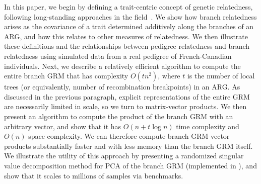 In this paper, we begin by defining a trait-centric concept of genetic relatedness, following
long-standing approaches in the 
field~\citep{fisher1919correlation, wright1922coefficients}. 
We show how branch relatedness arises as the
covariance of a trait determined additively along the branches of an ARG, and how
this relates to other measures of relatedness.
We then illustrate these definitions and the relationships between pedigree
relatedness and branch relatedness using simulated data from a real pedigree of
French-Canadian individuals. 
Next, we describe a relatively efficient algorithm to compute the entire branch GRM
that has complexity
$O(t n^2)$, where $t$ is the number of local trees (or equivalently, number 
of recombination breakpoints) in an ARG.
As discussed in the previous paragraph, explicit representations of the entire GRM
are necessarily limited in scale, so we turn to matrix-vector products.
We then present an algorithm to compute the product of the branch GRM with
an arbitrary vector, and show that it has 
$O(n + t \log{n})$ time complexity and $O(n)$ space complexity.
We can therefore compute branch GRM-vector products 
substantially faster and with less memory than the branch GRM itself.
We illustrate the utility of this approach by presenting a
randomized singular value decomposition method 
for PCA of the branch GRM  (implemented  in \tskit{}),
and show that it scales to millions of samples via benchmarks.
